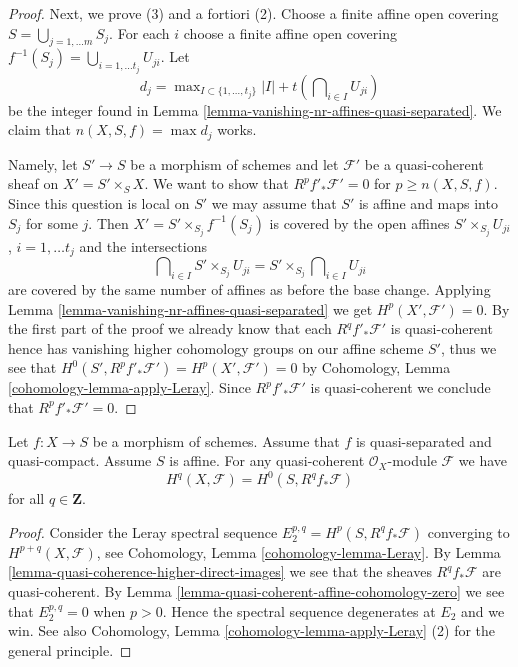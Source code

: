 \begin{proof}
\medskip\noindent
Next, we prove (3) and a fortiori (2). Choose a finite affine open
covering $S = \bigcup_{j = 1, \ldots m} S_j$. For each $i$ choose
a finite affine open covering
$f^{-1}(S_j) = \bigcup_{i = 1, \ldots t_j} U_{ji} $.
Let
$$
d_j = \max\nolimits_{I \subset \{1, \ldots, t_j\}}
|I| + t(\bigcap\nolimits_{i \in I} U_{ji})
$$
be the integer found in
Lemma \ref{lemma-vanishing-nr-affines-quasi-separated}.
We claim that $n(X, S, f) = \max d_j$ works.

\medskip\noindent
Namely, let $S' \to S$ be a morphism of schemes and let
$\mathcal{F}'$ be a quasi-coherent sheaf on $X' = S' \times_S X$.
We want to show that $R^pf'_*\mathcal{F}' = 0$ for $p \geq n(X, S, f)$.
Since this question is local on $S'$ we may assume that $S'$ is affine
and maps into $S_j$ for some $j$. Then $X' = S' \times_{S_j} f^{-1}(S_j)$
is covered by the open affines $S' \times_{S_j} U_{ji}$, $i = 1, \ldots t_j$
and the intersections
$$
\bigcap\nolimits_{i \in I} S' \times_{S_j} U_{ji} =
S' \times_{S_j} \bigcap\nolimits_{i \in I} U_{ji}
$$
are covered by the same number of affines as before the base change.
Applying
Lemma \ref{lemma-vanishing-nr-affines-quasi-separated}
we get $H^p(X', \mathcal{F}') = 0$. By the first part of the proof
we already know that each $R^qf'_*\mathcal{F}'$ is quasi-coherent
hence has vanishing higher cohomology groups on our affine scheme $S'$,
thus we see that $H^0(S', R^pf'_*\mathcal{F}') = H^p(X', \mathcal{F}') = 0$
by Cohomology, Lemma \ref{cohomology-lemma-apply-Leray}.
Since $R^pf'_*\mathcal{F}'$ is quasi-coherent
we conclude that $R^pf'_*\mathcal{F}' = 0$.
\end{proof}

\begin{lemma}
\label{lemma-quasi-coherence-higher-direct-images-application}
Let $f : X \to S$ be a morphism of schemes.
Assume that $f$ is quasi-separated and quasi-compact.
Assume $S$ is affine.
For any quasi-coherent $\mathcal{O}_X$-module $\mathcal{F}$
we have
$$
H^q(X, \mathcal{F}) = H^0(S, R^qf_*\mathcal{F})
$$
for all $q \in \mathbf{Z}$.
\end{lemma}

\begin{proof}
Consider the Leray spectral sequence $E_2^{p, q} = H^p(S, R^qf_*\mathcal{F})$
converging to $H^{p + q}(X, \mathcal{F})$, see
Cohomology, Lemma \ref{cohomology-lemma-Leray}.
By Lemma \ref{lemma-quasi-coherence-higher-direct-images}
we see that the sheaves $R^qf_*\mathcal{F}$ are quasi-coherent.
By Lemma \ref{lemma-quasi-coherent-affine-cohomology-zero}
we see that $E_2^{p, q} = 0$ when $p > 0$.
Hence the spectral sequence degenerates at $E_2$ and we win.
See also
Cohomology, Lemma \ref{cohomology-lemma-apply-Leray} (2)
for the general principle.
\end{proof}









